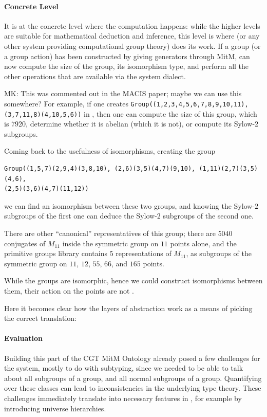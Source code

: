 \paragraph{Concrete Level}
It is at the concrete level where the computation happens: while the higher levels
are suitable for mathematical deduction and inference, this level is where \GAP
(or any other system providing computational group theory) does its work.
If a group (or a group action) has been constructed by giving generators
through MitM, \GAP can now compute the size of the group, its isomorphism type,
and perform all the other operations that are available via the \GAP system
dialect.

\begin{oldpart}{MK: This was commented out in the MACIS paper; maybe we can use this somewhere?}
For example, if one creates \lstinline|Group((1,2,3,4,5,6,7,8,9,10,11),(3,7,11,8)(4,10,5,6))|
in \GAP, then one can compute the size of this group, which is $7920$, determine
whether it is abelian (which it is not), or compute its Sylow-$2$ subgroups.

Coming back to the usefulness of isomorphisms, creating the group
\begin{lstlisting}
Group((1,5,7)(2,9,4)(3,8,10), (2,6)(3,5)(4,7)(9,10), (1,11)(2,7)(3,5)(4,6),
(2,5)(3,6)(4,7)(11,12))
\end{lstlisting}
we can find an isomorphism between these two groups, and knowing the Sylow-$2$
subgroups of the first one can deduce the Sylow-$2$ subgroups of the second one.

There are other ``canonical'' representatives of this group; there are $5040$ conjugates
of $M_{11}$ inside the symmetric group on $11$ points alone, and the \GAP primitive groups
library contains $5$ representations of $M_{11}$, as subgroups of the symmetric group on
$11$, $12$, $55$, $66$, and $165$ points.

While the groups are isomorphic, hence we could construct isomorphisms between
them, their action on the points are not .

Here it becomes clear how the layers of abstraction work as a means of picking the correct
translation:

\paragraph{Evaluation}
Building this part of the CGT MitM Ontology already posed a few challenges for the \MMT
system, mostly to do with subtyping, since we needed to be able to talk about all
subgroups of a group, and all normal subgroups of a group. Quantifying over these classes
can lead to inconsistencies in the underlying type theory.  These challenges immediately
translate into necessary features in \OMMT, for example by introducing universe
hierarchies.  
\end{oldpart}

